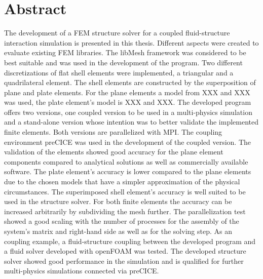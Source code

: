 \section*{Abstract}

The development of a FEM structure solver for a coupled fluid-structure interaction simulation is presented in this thesis. Different aspects were created to evaluate existing FEM libraries. The libMesh framework was considered to be best suitable and was used in the development of the program. Two different discretizations of flat shell elements were implemented, a triangular and a quadrilateral element. The shell elements are constructed by the superposition of plane and plate elements. For the plane elements a model from XXX and XXX was used, the plate element's model is XXX and XXX. The developed program offers two versions, one coupled version to be used in a multi-physics simulation and a stand-alone version whose intention was to better validate the implemented finite elements. Both versions are parallelized with MPI. The coupling environment preCICE was used in the development of the coupled version. The validation of the elements showed good accuracy for the plane element components compared to analytical solutions as well as commercially available software. The plate element's accuracy is lower compared to the plane elements due to the chosen models that have a simpler approximation of the physical circumstances. The superimposed shell element's accuracy is well suited to be used in the structure solver. For both finite elements the accuracy can be increased arbitrarily by subdividing the mesh further. The parallelization test showed a good scaling with the number of processes for the assembly of the system's matrix and right-hand side as well as for the solving step. As an coupling example, a fluid-structure coupling between the developed program and a fluid solver developed with openFOAM was tested. The developed structure solver showed good performance in the simulation and is qualified for further multi-physics simulations connected via preCICE.
\newpage